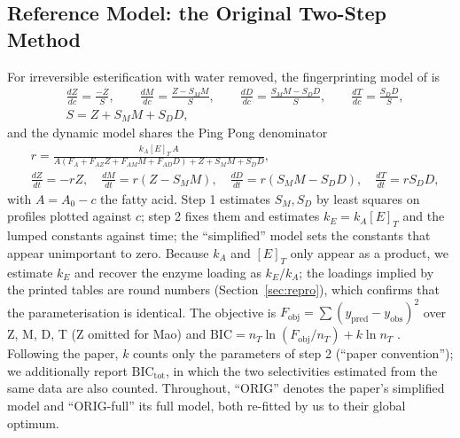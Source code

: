 \subsection{Reference Model: the Original Two-Step Method}
For irreversible esterification with water removed, the fingerprinting model of \cite{nishimura2026} is
\begin{equation}
\begin{aligned}
&\frac{dZ}{dc}=\frac{-Z}{S},\qquad \frac{dM}{dc}=\frac{Z-S_MM}{S},\qquad \frac{dD}{dc}=\frac{S_MM-S_DD}{S},\qquad\frac{dT}{dc}=\frac{S_DD}{S},\\
&S=Z+S_MM+S_DD,
\end{aligned}\label{eq:fp}
\end{equation}
and the dynamic model shares the Ping Pong denominator
\begin{equation}
\begin{aligned}
&r=\frac{k_A[E]_T\,A}{A(F_A+F_{AZ}Z+F_{AM}M+F_{AD}D)+Z+S_MM+S_DD},\\
&\frac{dZ}{dt}=-rZ,\quad \frac{dM}{dt}=r(Z-S_MM),\quad \frac{dD}{dt}=r(S_MM-S_DD),\quad \frac{dT}{dt}=rS_DD,
\end{aligned}\label{eq:dyn}
\end{equation}
with $A=A_0-c$ the fatty acid. Step 1 estimates $S_M,S_D$ by least squares on profiles plotted against $c$; step 2 fixes them and estimates $k_E=k_A[E]_T$ and the lumped constants against time; the ``simplified'' model sets the constants that appear unimportant to zero. Because $k_A$ and $[E]_T$ only appear as a product, we estimate $k_E$ and recover the enzyme loading as $k_E/k_A$; the loadings implied by the printed tables are round numbers (Section~\ref{sec:repro}), which confirms that the parameterisation is identical. The objective is $F_\mathrm{obj}=\sum(y_\mathrm{pred}-y_\mathrm{obs})^2$ over Z, M, D, T (Z omitted for Mao) and $\mathrm{BIC}=n_T\ln(F_\mathrm{obj}/n_T)+k\ln n_T$ \cite{schwarz1978}. Following the paper, $k$ counts only the parameters of step 2 (``paper convention''); we additionally report $\mathrm{BIC}_\mathrm{tot}$, in which the two selectivities estimated from the same data are also counted. Throughout, ``ORIG'' denotes the paper's simplified model and ``ORIG-full'' its full model, both re-fitted by us to their global optimum.

